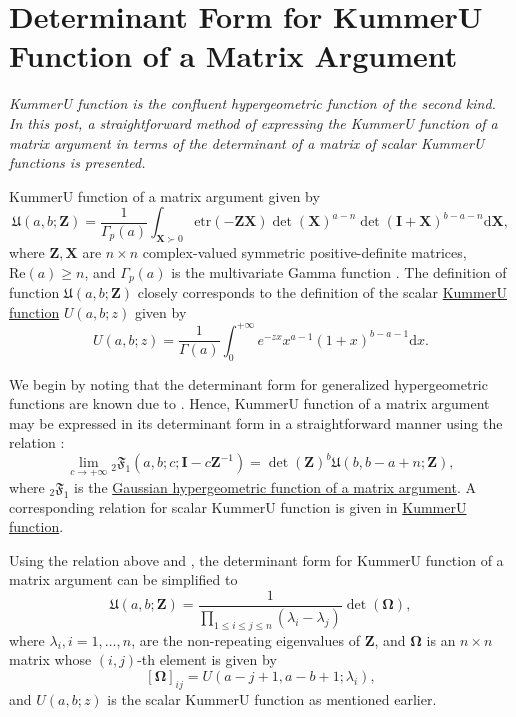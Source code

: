 \section{Determinant Form for KummerU Function of a Matrix Argument}

\emph{KummerU function is the confluent hypergeometric function of the second kind. In this post, a straightforward method of expressing the KummerU function of a matrix argument in terms of the determinant of a matrix of scalar KummerU functions is presented.}

KummerU function of a matrix argument \cite[Definition 1.3.6]{Gupta1999} given by $$\mathfrak{U}(a,b;\boldsymbol{Z}) = \frac{1}{\Gamma_p(a)}\int_{\boldsymbol{X} \succ 0} \text{etr}(-\boldsymbol{Z}\boldsymbol{X}) \det(\boldsymbol{X})^{a-n} \det(\boldsymbol{I} + \boldsymbol{X})^{b-a-n} \text{d}\boldsymbol{X},$$ where $\boldsymbol{Z}, \boldsymbol{X}$ are $n\times n$ complex-valued symmetric positive-definite matrices, $\text{Re}(a) \geq n$, and $\Gamma_p(a)$ is the multivariate Gamma function \cite{Olver2010}. The definition of function $\mathfrak{U}(a,b;\boldsymbol{Z})$ closely corresponds to the definition of the scalar \href{https://mathworld.wolfram.com/ConfluentHypergeometricFunctionoftheSecondKind.html}{KummerU function} $U(a,b;z)$ given by $$U(a,b;z) = \frac{1}{\Gamma(a)} \int_{0}^{+\infty} e^{-zx} x^{a-1} (1+x)^{b-a-1} \text{d}x.$$

We begin by noting that the determinant form for generalized hypergeometric functions are known due to \cite[Eqn. 34]{Orlov2003}. Hence, KummerU function of a matrix argument may be expressed in its determinant form in a straightforward manner using the relation \cite[Definition 1.3.6]{Gupta1999}: $$\lim_{c\to +\infty} {}_2\mathfrak{F}_{1}(a,b;c;\boldsymbol{I}-c\boldsymbol{Z}^{-1}) = \det(\boldsymbol{Z})^b \mathfrak{U}(b,b-a+n; \boldsymbol{Z}),$$ where ${}_2\mathfrak{F}_{1}$ is the \href{https://en.wikipedia.org/wiki/Hypergeometric_function_of_a_matrix_argument}{Gaussian hypergeometric function of a matrix argument}. A corresponding relation for scalar KummerU function is given in \href{https://mathworld.wolfram.com/ConfluentHypergeometricFunctionoftheSecondKind.html}{KummerU function}.

Using the relation above and \cite[Eqn. 34]{Orlov2003}, the determinant form for KummerU function of a matrix argument can be simplified to $$\mathfrak{U}(a,b;\boldsymbol{Z}) = \frac{1}{\prod_{1\leq i \leq j \leq n}(\lambda_i-\lambda_j)}\det(\boldsymbol{\Omega}),$$ where $\lambda_i,i=1,\dots,n$, are the non-repeating eigenvalues of $\boldsymbol{Z}$, and $\boldsymbol{\Omega}$ is an $n\times n$ matrix whose $(i,j)$-th element is given by $$[\boldsymbol{\Omega}]_{ij} = U(a-j+1,a-b+1;\lambda_i),$$ and $U(a,b;z)$ is the scalar KummerU function as mentioned earlier.

